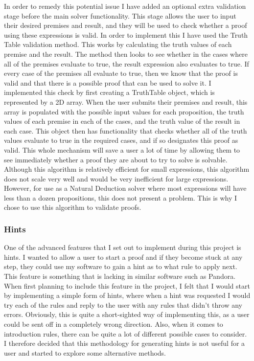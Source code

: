 In order to remedy this potential issue I have added an optional extra validation stage before the main solver functionality. This stage allows the user to input their desired premises and result, and they will be used to check whether a proof using these expressions is valid. In order to implement this I have used the Truth Table validation method. This works by calculating the truth values of each premise and the result. The method then looks to see whether in the cases where all of the premises evaluate to true, the result expression also evaluates to true. If every case of the premises all evaluate to true, then we know that the proof is valid and that there is a possible proof that can be used to solve it. I implemented this check by first creating a TruthTable object, which is represented by a 2D array. When the user submits their premises and result, this array is populated with the possible input values for each proposition, the truth values of each premise in each of the cases, and the truth value of the result in each case. This object then has functionality that checks whether all of the truth values evaluate to true in the required cases, and if so designates this proof as valid. This whole mechanism will save a user a lot of time by allowing them to see immediately whether a proof they are about to try to solve is solvable. Although this algorithm is relatively efficient for small expressions, this algorithm does not scale very well and would be very inefficient for large expressions. However, for use as a Natural Deduction solver where most expressions will have less than a dozen propositions, this does not present a problem. This is why I chose to use this algorithm to validate proofs. 

\subsubsection{Hints \label{hints}}

One of the advanced features that I set out to implement during this project is hints. I wanted to allow a user to start a proof and if they become stuck at any step, they could use my software to gain a hint as to what rule to apply next. This feature is something that is lacking in similar software such as Pandora. When first planning to include this feature in the project,  I felt that I would start by implementing a simple form of hints, where when a hint was requested I would try each of the rules and reply to the user with any rules that didn't throw any errors. Obviously, this is quite a short-sighted way of implementing this, as a user could be sent off in a completely wrong direction. Also, when it comes to introduction rules, there can be quite a lot of different possible cases to consider. I therefore decided that this methodology for generating hints is not useful for a user and started to explore some alternative methods.

